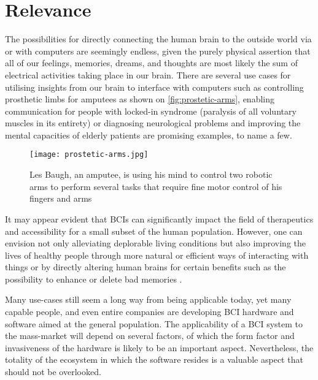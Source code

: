\section{Relevance}
\label{chapter1-relevance}

The possibilities for directly connecting the human brain to the outside world via or with computers are seemingly endless, given the purely physical assertion that all of our feelings, memories, dreams, and thoughts are most likely the sum of electrical activities taking place in our brain. There are several use cases for utilising insights from our brain to interface with computers such as controlling prosthetic limbs for amputees as shown on \autoref{fig:prostetic-arms}, enabling communication for people with locked-in syndrome (paralysis of all voluntary muscles in its entirety) \citep{chaudhary_spelling_2022} or diagnosing neurological problems and improving the mental capacities of elderly patients \citep{belkacem_brain_2020} are promising examples, to name a few.

\begin{figure}[ht]
  \centering
  \texttt{[image: prostetic-arms.jpg]}
  \caption{Les Baugh, an amputee, is using his mind to control two robotic arms to perform several tasks that require fine motor control of his fingers and arms \citep{campbell_amputee_2014}}
  \label{fig:prostetic-arms}
\end{figure}

\newpage

It may appear evident that BCIs can significantly impact the field of therapeutics and accessibility for a small subset of the human population. However, one can envision not only alleviating deplorable living conditions but also improving the lives of healthy people through more natural or efficient ways of interacting with things or by directly altering human brains for certain benefits such as the possibility to enhance or delete bad memories \citep{spiers_enhance_2014}.

Many use-cases still seem a long way from being applicable today, yet many capable people, and even entire companies are developing BCI hardware and software aimed at the general population. The applicability of a BCI system to the mass-market will depend on several factors, of which the form factor and invasiveness of the hardware is likely to be an important aspect. Nevertheless, the totality of the ecosystem in which the software resides is a valuable aspect that should not be overlooked.

